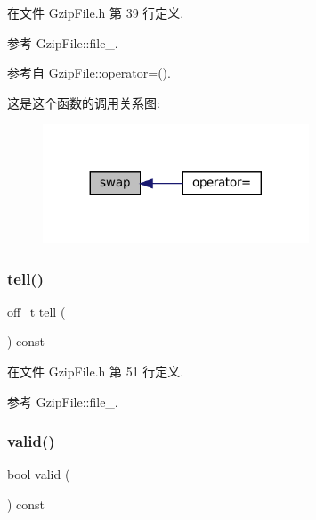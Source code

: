 在文件 Gzip\+File.\+h 第 39 行定义.



参考 Gzip\+File\+::file\+\_\+.



参考自 Gzip\+File\+::operator=().

这是这个函数的调用关系图\+:
\nopagebreak
\begin{figure}[H]
\begin{center}
\leavevmode
\includegraphics[width=224pt]{classmuduo_1_1GzipFile_a545d0ac9e0b6d92ec76093784b550cb2_icgraph}
\end{center}
\end{figure}
\mbox{\label{classmuduo_1_1GzipFile_a6e8ce06f95605b89cfcee42fc3e5162c}} 
\subsubsection{\texorpdfstring{tell()}{tell()}}
{\footnotesize\ttfamily off\+\_\+t tell (\begin{DoxyParamCaption}{ }\end{DoxyParamCaption}) const\hspace{0.3cm}{\ttfamily [inline]}}



在文件 Gzip\+File.\+h 第 51 行定义.



参考 Gzip\+File\+::file\+\_\+.

\mbox{\label{classmuduo_1_1GzipFile_a315419f26d3c59fa143b49b90a019049}} 
\subsubsection{\texorpdfstring{valid()}{valid()}}
{\footnotesize\ttfamily bool valid (\begin{DoxyParamCaption}{ }\end{DoxyParamCaption}) const\hspace{0.3cm}{\ttfamily [inline]}}



